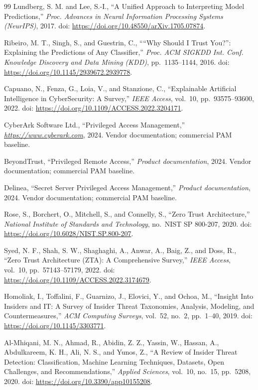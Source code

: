 \documentclass[11pt,a4paper,oneside]{report}
\theoremstyle{definition}
\theoremstyle{plain}
\begin{document}
\begin{thebibliography}{99}
Lundberg, S. M. and Lee, S.-I., ``A Unified Approach to Interpreting Model Predictions,'' \emph{Proc. Advances in Neural Information Processing Systems ({NeurIPS})}, 2017. doi: \url{https://doi.org/10.48550/arXiv.1705.07874}.

Ribeiro, M. T., Singh, S., and Guestrin, C., ````Why Should {I} Trust You?'': Explaining the Predictions of Any Classifier,'' \emph{Proc. {ACM} {SIGKDD} Int. Conf. Knowledge Discovery and Data Mining ({KDD})}, pp.~1135--1144, 2016. doi: \url{https://doi.org/10.1145/2939672.2939778}.

Capuano, N., Fenza, G., Loia, V., and Stanzione, C., ``Explainable Artificial Intelligence in CyberSecurity: A Survey,'' \emph{IEEE Access}, vol.~10, pp.~93575--93600, 2022. doi: \url{https://doi.org/10.1109/ACCESS.2022.3204171}.

{CyberArk Software Ltd.}, ``Privileged Access Management,'' \emph{\url{https://www.cyberark.com}}, 2024. Vendor documentation; commercial PAM baseline.

{BeyondTrust}, ``Privileged Remote Access,'' \emph{Product documentation}, 2024. Vendor documentation; commercial PAM baseline.

{Delinea}, ``Secret Server Privileged Access Management,'' \emph{Product documentation}, 2024. Vendor documentation; commercial PAM baseline.

Rose, S., Borchert, O., Mitchell, S., and Connelly, S., ``Zero Trust Architecture,'' \emph{National Institute of Standards and Technology}, no.~NIST SP 800-207, 2020. doi: \url{https://doi.org/10.6028/NIST.SP.800-207}.

Syed, N. F., Shah, S. W., Shaghaghi, A., Anwar, A., Baig, Z., and Doss, R., ``Zero Trust Architecture ({ZTA}): A Comprehensive Survey,'' \emph{IEEE Access}, vol.~10, pp.~57143--57179, 2022. doi: \url{https://doi.org/10.1109/ACCESS.2022.3174679}.

Homoliak, I., Toffalini, F., Guarnizo, J., Elovici, Y., and Ochoa, M., ``Insight Into Insiders and {IT}: A Survey of Insider Threat Taxonomies, Analysis, Modeling, and Countermeasures,'' \emph{ACM Computing Surveys}, vol.~52, no.~2, pp.~1--40, 2019. doi: \url{https://doi.org/10.1145/3303771}.

Al-Mhiqani, M. N., Ahmad, R., Abidin, Z. Z., Yassin, W., Hassan, A., Abdulkareem, K. H., Ali, N. S., and Yunos, Z., ``A Review of Insider Threat Detection: Classification, Machine Learning Techniques, Datasets, Open Challenges, and Recommendations,'' \emph{Applied Sciences}, vol.~10, no.~15, pp.~5208, 2020. doi: \url{https://doi.org/10.3390/app10155208}.


\end{thebibliography}
\end{document}
